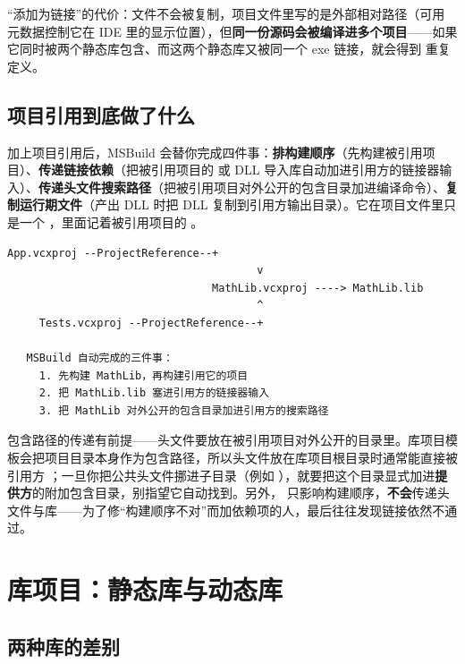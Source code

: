 {“添加为链接”的代价：文件不会被复制，项目文件里写的是外部相对路径（可用  元数据控制它在 IDE 里的显示位置），但\textbf{同一份源码会被编译进多个项目}——如果它同时被两个静态库包含、而这两个静态库又被同一个 exe 链接，就会得到  重复定义。

\subsection{项目引用到底做了什么}

加上项目引用后，MSBuild 会替你完成四件事：\textbf{排构建顺序}（先构建被引用项目）、\textbf{传递链接依赖}（把被引用项目的  或 DLL 导入库自动加进引用方的链接器输入）、\textbf{传递头文件搜索路径}（把被引用项目对外公开的包含目录加进编译命令）、\textbf{复制运行期文件}（产出 DLL 时把 DLL 复制到引用方输出目录）。它在项目文件里只是一个 ，里面记着被引用项目的 。

\begin{lstlisting}[style=textstyle]
        App.vcxproj --ProjectReference--+
                                       v
                                MathLib.vcxproj ----> MathLib.lib
                                       ^
     Tests.vcxproj --ProjectReference--+

   MSBuild 自动完成的三件事：
     1. 先构建 MathLib，再构建引用它的项目
     2. 把 MathLib.lib 塞进引用方的链接器输入
     3. 把 MathLib 对外公开的包含目录加进引用方的搜索路径
\end{lstlisting}

\begin{warnbox}[注意]
包含路径的传递有前提——头文件要放在被引用项目对外公开的目录里。库项目模板会把项目目录本身作为包含路径，所以头文件放在库项目根目录时通常能直接被引用方 ；一旦你把公共头文件挪进子目录（例如 ），就要把这个目录显式加进\textbf{提供方}的附加包含目录，别指望它自动找到。另外， 只影响构建顺序，\textbf{不会}传递头文件与库——为了修“构建顺序不对”而加依赖项的人，最后往往发现链接依然不通过。
\end{warnbox}

\section{库项目：静态库与动态库}

\subsection{两种库的差别}

}
